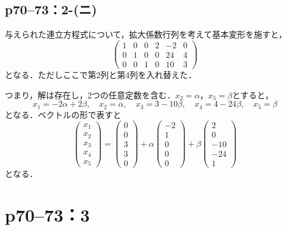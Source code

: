 \documentclass[a4paper,10pt,fleqn]{ltjsarticle}
\begin{document}
\subsection*{p70--73：2-(ニ)}

\begin{tleftbar}
    与えられた連立方程式について，拡大係数行列を考えて基本変形を施すと，
    \[
        \begin{pmatrix} 1 & 0 & 0  & 2 & -2 & 0  \\ 0 & 1& 0  & 0 & 24 & 4 \\ 0 & 0 & 1 & 0 & 10 & 3 \end{pmatrix}
    \]
    となる．ただしここで第2列と第4列を入れ替えた．

    つまり，解は存在し，$2$つの任意定数を含む．$x_2 = \alpha$，$x_5 = \beta$とすると，
    \[
        x_1 = -2\alpha + 2\beta  , \quad x_2 =\alpha  , \quad x_3 = 3 -10\beta  , \quad x_4 = 4 -24 \beta ,\quad x_5 =\beta
    \]
    となる．ベクトルの形で表すと
    \[
        \begin{pmatrix} x_1 \\ x_2 \\ x_3 \\ x_4 \\ x_5 \end{pmatrix}= \begin{pmatrix} 0 \\ 0 \\ 3 \\ 3 \\ 0 \end{pmatrix} +\alpha \begin{pmatrix} -2 \\ 1\\ 0 \\ 0 \\ 0 \end{pmatrix} + \beta \begin{pmatrix} 2 \\ 0 \\ -10 \\ -24 \\ 1 \end{pmatrix}
    \]
    となる．
\end{tleftbar}


\newpage

\section*{p70--73：3}
\end{document}
